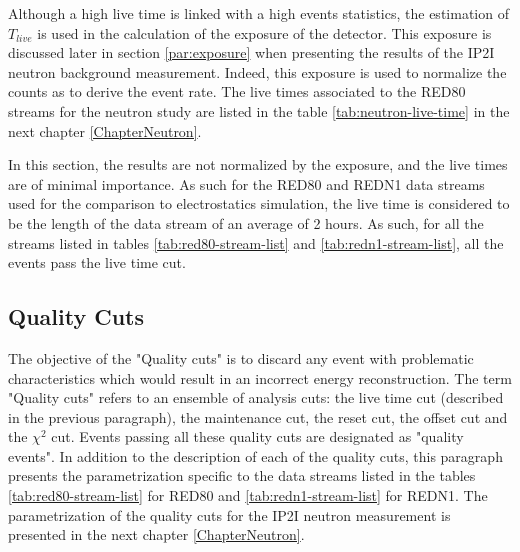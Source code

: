 Although a high live time is linked with a high events statistics, the estimation of $T_{live}$ is used in the calculation of the exposure of the detector. This exposure is discussed later in section \ref{par:exposure} when presenting the results of the IP2I neutron background measurement. Indeed, this exposure is used to normalize the counts as to derive the event rate. The live times associated to the RED80 streams for the neutron study are listed in the table \ref{tab:neutron-live-time} in the next chapter \ref{ChapterNeutron}.

In this section, the results are not normalized by the exposure, and the live times are of minimal importance. As such for the RED80 and REDN1 data streams used for the comparison to electrostatics simulation, the live time is considered to be the length of the data stream of an average of 2 hours. As such, for all the streams listed in tables \ref{tab:red80-stream-list} and \ref{tab:redn1-stream-list}, all the events pass the live time cut.


\subsection{Quality Cuts}
\label{par:quality-cuts}
\label{par:maintenance-cut}
\label{par:reset-cut}


The objective of the "Quality cuts" is to discard any event with problematic characteristics which would result in an incorrect energy reconstruction. The term "Quality cuts" refers to an ensemble of analysis cuts: the live time cut (described in the previous paragraph), the maintenance cut, the reset cut, the offset cut and the $\chi^2$ cut. Events passing all these quality cuts are designated as "quality events". In addition to the description of each of the quality cuts, this paragraph presents the parametrization specific to the data streams listed in the tables \ref{tab:red80-stream-list} for RED80 and \ref{tab:redn1-stream-list} for REDN1. The parametrization of the quality cuts for the IP2I neutron measurement is presented in the next chapter \ref{ChapterNeutron}.

